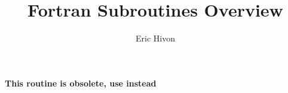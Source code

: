 
\sloppy


\title{\healpix Fortran Subroutines Overview}
 \section[getdisc\_ring]{ }
\label{sub:getdisc_ring}
\author{Eric Hivon}

\begin{facility}
{ %
{\bf This routine is obsolete, use  instead} }
{\modPixTools}
\end{facility}





